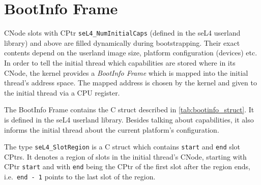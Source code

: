 \section{\label{ch:bootup:bootinfo}BootInfo Frame}

CNode slots with CPtr \texttt{seL4\_NumInitialCaps} (defined in the seL4
userland library) and above are filled dynamically during
bootstrapping. Their exact contents depend on the userland image size,
platform configuration (devices) etc. In order to tell the initial thread
which capabilities are stored where in its CNode, the kernel provides
a \emph{BootInfo Frame} which is mapped into the initial thread's address
space. The mapped address is chosen by the kernel and given to the initial
thread via a CPU register.

The BootInfo Frame contains the C struct described in
\autoref{tab:bootinfo_struct}.
It is defined in the seL4 userland library. Besides talking about
capabilities, it also informs the initial thread about
the current platform's configuration.

The type \texttt{seL4\_SlotRegion} is a C struct
which contains \texttt{start} and \texttt{end} slot CPtrs. It denotes a region
of slots in the initial thread's CNode, starting with CPtr \texttt{start} and with
\texttt{end} being the CPtr of the first slot after the region ends, i.e.\
\texttt{end - 1} points to the last slot of the region.

